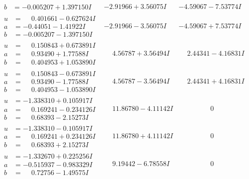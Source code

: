 \documentclass[1p]{elsarticle_modified}
\theoremstyle{definition}
\begin{document}
$$\begin{array}{c|c|c}
\begin{aligned}
b &= -0.005207 + 1.397150 I\end{aligned}
 & -2.91966 + 3.56075 I & -4.59067 - 7.53774 I \\ \hline\begin{aligned}
u &= \phantom{-}0.401661 - 0.627624 I \\
a &= -0.44051 - 1.41922 I \\
b &= -0.005207 - 1.397150 I\end{aligned}
 & -2.91966 - 3.56075 I & -4.59067 + 7.53774 I \\ \hline\begin{aligned}
u &= \phantom{-}0.150843 + 0.673891 I \\
a &= \phantom{-}0.93490 + 1.77588 I \\
b &= \phantom{-}0.404953 + 1.053890 I\end{aligned}
 & \phantom{-}4.56787 + 3.56494 I & \phantom{-}2.44341 - 4.16831 I \\ \hline\begin{aligned}
u &= \phantom{-}0.150843 - 0.673891 I \\
a &= \phantom{-}0.93490 - 1.77588 I \\
b &= \phantom{-}0.404953 - 1.053890 I\end{aligned}
 & \phantom{-}4.56787 - 3.56494 I & \phantom{-}2.44341 + 4.16831 I \\ \hline\begin{aligned}
u &= -1.338310 + 0.105917 I \\
a &= \phantom{-}0.169241 - 0.234126 I \\
b &= \phantom{-}0.68393 - 2.15273 I\end{aligned}
 & \phantom{-}11.86780 - 4.11142 I & \phantom{-0.000000 } 0 \\ \hline\begin{aligned}
u &= -1.338310 - 0.105917 I \\
a &= \phantom{-}0.169241 + 0.234126 I \\
b &= \phantom{-}0.68393 + 2.15273 I\end{aligned}
 & \phantom{-}11.86780 + 4.11142 I & \phantom{-0.000000 } 0 \\ \hline\begin{aligned}
u &= -1.332670 + 0.225256 I \\
a &= -0.515937 - 0.983329 I \\
b &= \phantom{-}0.72756 - 1.49575 I\end{aligned}
 & \phantom{-}9.19442 - 6.78558 I & \phantom{-0.000000 } 0 \\ \hline\begin{aligned}

\end{aligned}
\end{array}$$
\end{document}
